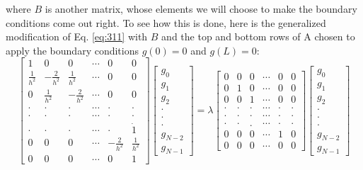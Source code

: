 where $B$ is another matrix, whose elements we will choose to make the boundary
conditions come out right. To see how this is done, here is the generalized modification of Eq. \eqref{eq:311} with $B$ and the top and bottom rows of A chosen to apply the boundary conditions
$g (0) = 0$ and $g(L)= 0$:
\begin{equation}
\left[\begin{array}{cccccc}
1 & 0 & 0 & \cdots & 0 & 0 \\
\frac{1}{h^{2}} & -\frac{2}{h^{2}} & \frac{1}{h^{2}} & \cdots & 0 & 0 \\
0 & \frac{1}{h^{2}} & -\frac{2}{h^{2}} & \cdots & 0 & 0 \\
\cdot & \cdot & \cdot & \cdots & \cdot & \cdot \\
\cdot & \cdot & \cdot & \cdots & \cdot & \cdot \\
\cdot & \cdot & \cdot & \cdots & \cdot & \dot{1} \\
0 & 0 & 0 & \cdots & -\frac{2}{h^{2}} & \frac{1}{h^{2}} \\
0 & 0 & 0 & \cdots & 0 & 1
\end{array}\right]\left[\begin{array}{c}
g_{0} \\
g_{1} \\
g_{2} \\
\cdot \\
\cdot \\
\cdot \\
g_{N-2} \\
g_{N-1}
\end{array}\right] = \lambda
\left[\begin{array}{cccccc}
0 & 0 & 0 & \cdots & 0 & 0 \\
0 & 1 & 0 & \cdots & 0 & 0 \\
0 & 0 & 1 & \cdots & 0 & 0 \\
\cdot & \cdot & \cdot & \cdots & \cdot & \cdot \\
\cdot & \cdot & \cdot & \cdots & \cdot & \cdot \\
\cdot & \cdot & . & \cdots & \cdot & \cdot \\
0 & 0 & 0 & \cdots & 1 & 0 \\
0 & 0 & 0 & \cdots & 0 & 0
\end{array}\right]\left[\begin{array}{r}
g_{0} \\
g_{1} \\
g_{2} \\
\cdot \\
\cdot \\
\cdot \\
g_{N-2} \\
g_{N-1}
\end{array}\right]
\end{equation}
